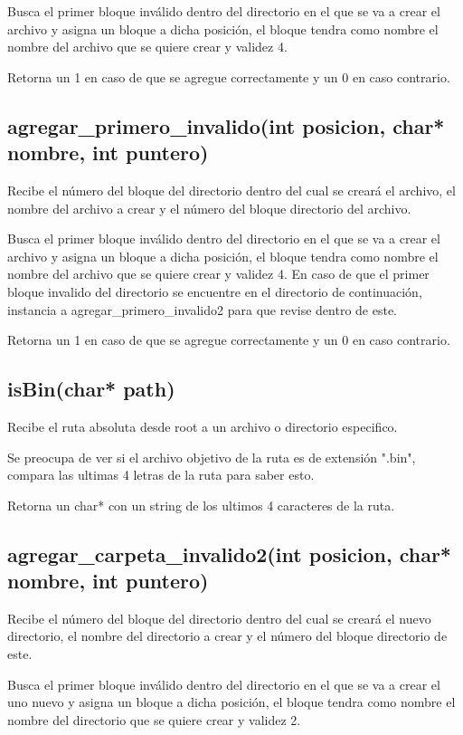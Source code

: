 \documentclass[12pt]{article}
\begin{document}
Busca el primer bloque inválido dentro del directorio en el que se va a crear el archivo y asigna un bloque a dicha posición, el bloque tendra como nombre el nombre del archivo que se quiere crear y validez 4.

Retorna un 1 en caso de que se agregue correctamente y un 0 en caso contrario.


\subsection{agregar\_primero\_invalido(int posicion, char* nombre, int puntero)}
Recibe el número del bloque del directorio dentro del cual se creará el archivo, el nombre del archivo a crear y el número del bloque directorio del archivo.

Busca el primer bloque inválido dentro del directorio en el que se va a crear el archivo y asigna un bloque a dicha posición, el bloque tendra como nombre el nombre del archivo que se quiere crear y validez 4. En caso de que el primer bloque invalido del directorio se encuentre en el directorio de continuación, instancia a agregar\_primero\_invalido2 para que revise dentro de este.

Retorna un 1 en caso de que se agregue correctamente y un 0 en caso contrario.

\subsection{isBin(char* path)}
Recibe el ruta absoluta desde root a un archivo o directorio especifico.

Se preocupa de ver si el archivo objetivo de la ruta es de extensión ".bin", compara las ultimas 4 letras de la ruta para saber esto.

Retorna un char* con un string de los ultimos 4 caracteres de la ruta.

\subsection{agregar\_carpeta\_invalido2(int posicion, char* nombre, int puntero)}
Recibe el número del bloque del directorio dentro del cual se creará el nuevo directorio, el nombre del directorio a crear y el número del bloque directorio de este.

Busca el primer bloque inválido dentro del directorio en el que se va a crear el uno nuevo y asigna un bloque a dicha posición, el bloque tendra como nombre el nombre del directorio que se quiere crear y validez 2.
\end{document}
